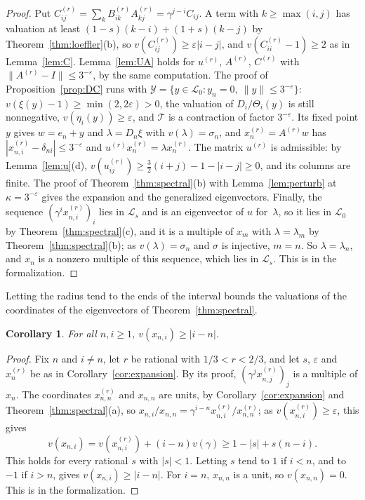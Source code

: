 \documentclass[11pt]{amsart}
\newtheorem{corollary}[theorem]{Corollary}
\theoremstyle{definition}
\numberwithin{equation}{section}
\newcommand{\lean}[1]{\ignorespaces}
\newcommand{\cL}{\mathcal{L}}
\newcommand{\Lc}{\mathcal{L}_0}
\newcommand{\sig}{\sigma}
\begin{document}
\begin{proof}
Put $C^{(r)}_{ij}=\sum_kB^{(r)}_{ik}A^{(r)}_{kj}=\gamma^{j-i}C_{ij}$. A term with $k\ge\max(i,j)$ has valuation at least $(1-s)(k-i)+(1+s)(k-j)$ by Theorem~\ref{thm:loeffler}(b), so $v(C^{(r)}_{ij})\ge\varepsilon|i-j|$, and $v(C^{(r)}_{ii}-1)\ge2$ as in Lemma~\ref{lem:C}. Lemma~\ref{lem:UA} holds for $u^{(r)}$, $A^{(r)}$, $C^{(r)}$ with $\|A^{(r)}-I\|\le3^{-\varepsilon}$, by the same computation. The proof of Proposition~\ref{prop:DC} runs with $\mathcal Y=\{y\in\Lc:y_n=0,\ \|y\|\le3^{-\varepsilon}\}$: $v(\xi(y)-1)\ge\min(2,2\varepsilon)>0$, the valuation of $D_i/\Theta_i(y)$ is still nonnegative, $v(\eta_i(y))\ge\varepsilon$, and $\mathcal T$ is a contraction of factor $3^{-\varepsilon}$. Its fixed point $y$ gives $w=e_n+y$ and $\lambda=D_n\xi$ with $v(\lambda)=\sig_n$, and $x^{(r)}_n=A^{(r)}w$ has $|x^{(r)}_{n,i}-\delta_{ni}|\le3^{-\varepsilon}$ and $u^{(r)}x^{(r)}_n=\lambda x^{(r)}_n$. The matrix $u^{(r)}$ is admissible: by Lemma~\ref{lem:u}(d), $v(u^{(r)}_{ij})\ge\frac32(i+j)-1-|i-j|\ge0$, and its columns are finite. The proof of Theorem~\ref{thm:spectral}(b) with Lemma~\ref{lem:perturb} at $\kappa=3^{-\varepsilon}$ gives the expansion and the generalized eigenvectors. Finally, the sequence $(\gamma^ix^{(r)}_{n,i})_i$ lies in $\cL_s$ and is an eigenvector of $u$ for~$\lambda$, so it lies in $\Lc$ by Theorem~\ref{thm:spectral}(c), and it is a multiple of $x_m$ with $\lambda=\lambda_m$ by Theorem~\ref{thm:spectral}(b); as $v(\lambda)=\sig_n$ and $\sig$ is injective, $m=n$. So $\lambda=\lambda_n$, and $x_n$ is a nonzero multiple of this sequence, which lies in $\cL_s$. This is  in the formalization.
\end{proof}

Letting the radius tend to the ends of the interval bounds the valuations of the coordinates of the eigenvectors of Theorem~\ref{thm:spectral}.

\begin{corollary}\label{cor:grading}\lean{CalegariSlopes.Conj5.norm_x_le, CalegariSlopes.Conj5.norm_x_le_of_norm, CalegariSlopes.Conj5.le_zpow_of_forall_rat}
For all $n,i\ge1$, $v(x_{n,i})\ge|i-n|$.
\end{corollary}

\begin{proof}
Fix $n$ and $i\ne n$, let $r$ be rational with $1/3<r<2/3$, and let $s$, $\varepsilon$ and $x^{(r)}_n$ be as in Corollary~\ref{cor:expansion}. By its proof, $(\gamma^jx^{(r)}_{n,j})_j$ is a multiple of $x_n$. The coordinates $x^{(r)}_{n,n}$ and $x_{n,n}$ are units, by Corollary~\ref{cor:expansion} and Theorem~\ref{thm:spectral}(a), so $x_{n,i}/x_{n,n}=\gamma^{i-n}x^{(r)}_{n,i}/x^{(r)}_{n,n}$; as $v(x^{(r)}_{n,i})\ge\varepsilon$, this gives
\[
v(x_{n,i})=v(x^{(r)}_{n,i})+(i-n)v(\gamma)\ge1-|s|+s(n-i).
\]
This holds for every rational $s$ with $|s|<1$. Letting $s$ tend to $1$ if $i<n$, and to $-1$ if $i>n$, gives $v(x_{n,i})\ge|i-n|$. For $i=n$, $x_{n,n}$ is a unit, so $v(x_{n,n})=0$. This is  in the formalization.
\end{proof}
\end{document}

